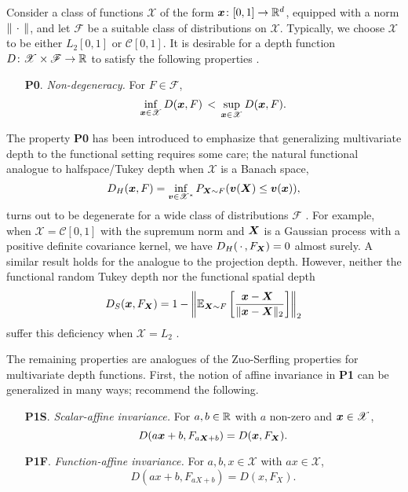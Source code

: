 Consider a class of functions $\mathscr{X}$ of the form $\bm{x}\colon [0, 1] \to
\mathbb{R}^d$, equipped with a norm $\Vert \,\cdot\, \Vert$, and let $\mathscr{F}$ be a
suitable class of distributions on $\mathscr{X}$.
Typically, we choose $\mathscr{X}$ to be either $L_2[0, 1]$ or $\mathcal{C}[0,
1]$.
It is desirable for a depth function $D\colon \mathscr{X} \times \mathscr{F}
\to \mathbb{R}$ to satisfy the following properties \parencite{gijbels-nagy-2017}.

\begin{enumerate}
    \item[\textbf{P0}.] \emph{Non-degeneracy.}
    For $F \in \mathscr{F}$,
    \begin{equation}
        \inf_{\bm{x} \in \mathscr{X}} D(\bm{x}, F) \,<\,
        \sup_{\bm{x} \in \mathscr{X}} D(\bm{x}, F).
    \end{equation}
\end{enumerate}

The property \textbf{P0} has been introduced to emphasize that generalizing
multivariate depth to the functional setting requires some care; the natural
functional analogue to halfspace/Tukey depth when $\mathscr{X}$ is a Banach
space,
\begin{equation}
    D_H(\bm{x}, F) = \inf_{\bm{v} \in \mathscr{X}^*} P_{\bm{X} \sim F}(\bm{v}(\bm{X}) \leq \bm{v}(\bm{x})),
\end{equation}
turns out to be degenerate for a wide class of distributions $\mathscr{F}$
\parencite{chakraborty-chaudhuri-2014a}.
For example, when $\mathscr{X} = \mathcal{C}[0, 1]$ with the supremum norm and
$\bm{X}$ is a Gaussian process with a positive definite covariance kernel, we
have $D_H(\,\cdot\,, F_{\bm{X}}) = 0$ almost surely.
A similar result holds for the analogue to the projection depth.
However, neither the functional random Tukey depth nor the functional spatial
depth
\begin{equation}
    D_S(\bm{x}, F_{\bm{X}}) = 1 - \left\Vert \operatorname{\mathbb{E}}_{\bm{X} \sim F} \left[\frac{\bm{x} - \bm{X}\;\,}{\Vert \bm{x} - \bm{X} \Vert_2}\right] \right\Vert_2
\end{equation}
suffer this deficiency when $\mathscr{X} = L_2$
\parencite{albertos-reyes-2008a, gijbels-nagy-2017}.


The remaining properties are analogues of the Zuo-Serfling properties for
multivariate depth functions.
First, the  notion of affine invariance in \textbf{P1} can be generalized in
many ways; \textcite{gijbels-nagy-2017} recommend the following.

\begin{enumerate}
    \item[\textbf{P1S}.] \emph{Scalar-affine invariance.}
    For $a, b \in \mathbb{R}$ with $a$ non-zero and $\bm{x} \in \mathscr{X}$,
    \begin{equation}
        D(a\bm{x} + b, F_{a\bm{X} + b}) = D(\bm{x}, F_{\bm{X}}).
    \end{equation}

    \item[\textbf{P1F}.] \emph{Function-affine invariance.}
    For $a, b, x \in \mathscr{X}$ with $ax \in \mathscr{X}$,
    \begin{equation}
        D(ax + b, F_{aX + b}) = D(x, F_{X}).
    \end{equation}
\end{enumerate}


